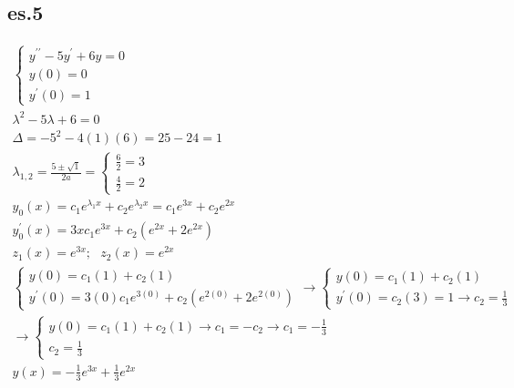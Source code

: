 \documentclass{article}
\begin{document}
\subsection{es.5}
\begin{equation*}
	\begin{matrix}
		\begin{cases}
			y^{\prime\prime}-5y^\prime+6y=0\\
			y(0)=0\\
			y^\prime(0)=1
		\end{cases}\\
		\lambda^2-5\lambda+6=0\\
		\Delta=-5^2-4(1)(6)=25-24=1\\
		\lambda_{1,2}=\frac{5\pm\sqrt{1}}{2a}=\begin{cases}
			\frac{6}{2}=3\\
			\frac{4}{2}=2
		\end{cases}\\
		y_0(x)=c_1e^{\lambda_1x} +
		c_2e^{\lambda_2x} =  c_1e^{3x} +
		c_2e^{2x} \\
		y_0^\prime(x)=3xc_1e^{3x}+c_2(e^{2x}+2e^{2x})\\
		z_1(x)=e^{3x}; \text{ } z_2(x)=e^{2x}\\
		\begin{cases}
			y(0)=c_1(1)+c_2(1)\\
			y^\prime(0)=3(0)c_1e^{3(0)}+c_2(e^{2(0)}+2e^{2(0)})
		\end{cases} \to \begin{cases}
			y(0)=c_1(1)+c_2(1)\\
			y^\prime(0)=c_2(3)=1 \to c_2 = \frac{1}{3}
		\end{cases}\\\to \begin{cases}
			y(0)=c_1(1)+c_2(1) \to c_1=-c_2 \to c_1=-\frac{1}{3}\\
			c_2 = \frac{1}{3}
		\end{cases}\\
		y(x)= -\frac{1}{3}e^{3x} + \frac{1}{3}e^{2x}
	\end{matrix}
\end{equation*}
\end{document}
